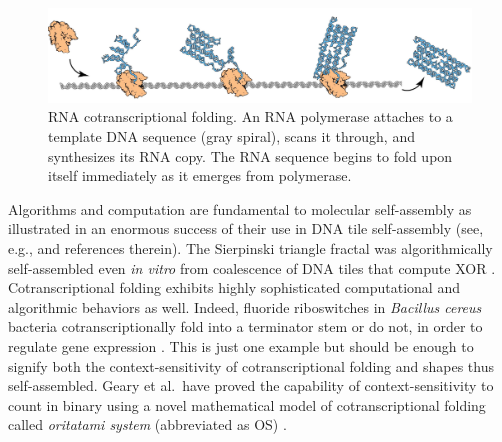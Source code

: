 \documentclass[runningheads]{llncs}
\begin{document}
\begin{figure}[tb]
\centering
\includegraphics[width=0.8\linewidth]{Figs/rna_origami.pdf}
\caption{RNA cotranscriptional folding. 
An RNA polymerase attaches to a template DNA sequence (gray spiral), scans it through, and synthesizes its RNA copy. 
The RNA sequence begins to fold upon itself immediately as it emerges from polymerase. 
}
\label{fig:rna_origami}
\end{figure}

Algorithms and computation are fundamental to molecular self-assembly as illustrated in an enormous success of their use in DNA tile self-assembly (see, e.g., \cite{Doty2012,Patitz2016,WinfreePhD} and references therein). 
The Sierpinski triangle fractal was algorithmically self-assembled even \textit{in vitro} from coalescence of DNA tiles that compute XOR \cite{RothemundPapadakisWinfree2004}. 
Cotranscriptional folding exhibits highly sophisticated computational and algorithmic behaviors as well. 
Indeed, fluoride riboswitches in \textit{Bacillus cereus} bacteria cotranscriptionally fold into a terminator stem or do not, in order to regulate gene expression \cite{WaStYuLiLu2016}. %
This is just one example but should be enough to signify both the context-sensitivity of cotranscriptional folding and shapes thus self-assembled. 
Geary et al.~have proved the capability of context-sensitivity to count in binary using a novel mathematical model of cotranscriptional folding called \textit{oritatami system} (abbreviated as OS) \cite{GeMeScSe2016}. 

\end{document}
